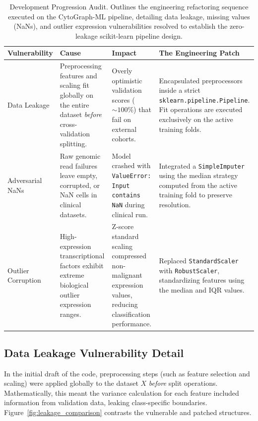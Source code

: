 \documentclass[journal,10pt]{IEEEtran}
\begin{document}
\begin{table}[htbp]
\centering
\caption{Development Progression Audit. Outlines the engineering refactoring sequence executed on the CytoGraph-ML pipeline, detailing data leakage, missing values (NaNs), and outlier expression vulnerabilities resolved to establish the zero-leakage scikit-learn pipeline design.}
\label{tab:audit_table}
\begin{tabular}{lp{4cm}p{4cm}p{5cm}}
\toprule
\textbf{Vulnerability} & \textbf{Cause} & \textbf{Impact} & \textbf{The Engineering Patch} \\
\midrule
Data Leakage & Preprocessing features and scaling fit globally on the entire dataset \textit{before} cross-validation splitting. & Overly optimistic validation scores ($\sim 100\%$) that fail on external cohorts. & Encapsulated preprocessors inside a strict \texttt{sklearn.pipeline.Pipeline}. Fit operations are executed exclusively on the active training folds. \\
\midrule
Adversarial NaNs & Raw genomic read failures leave empty, corrupted, or NaN cells in clinical datasets. & Model crashed with \texttt{ValueError: Input contains NaN} during clinical run. & Integrated a \texttt{SimpleImputer} using the median strategy computed from the active training fold to preserve resolution. \\
\midrule
Outlier Corruption & High-expression transcriptional factors exhibit extreme biological outlier expression ranges. & Z-score standard scaling compressed non-malignant expression values, reducing classification performance. & Replaced \texttt{StandardScaler} with \texttt{RobustScaler}, standardizing features using the median and IQR values. \\
\bottomrule
\end{tabular}
\end{table}

\subsection{Data Leakage Vulnerability Detail}
In the initial draft of the code, preprocessing steps (such as feature selection and scaling) were applied globally to the dataset $X$ \textit{before} split operations. Mathematically, this meant the variance calculation for each feature included information from validation data, leaking class-specific boundaries. Figure~\ref{fig:leakage_comparison} contrasts the vulnerable and patched structures.
\end{document}

